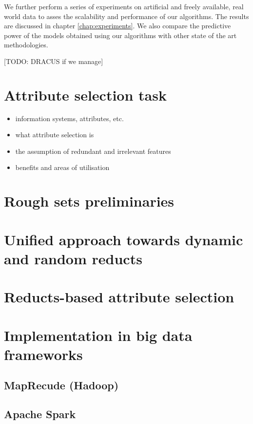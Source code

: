 \documentclass[12pt]{report}
\begin{document}
We further perform a series of experiments on artificial and freely available, real world data to asses the scalability and performance of our algorithms. The results are discussed in chapter \ref{chap:experiments}. We also compare the predictive power of the models obtained using our algorithms with other state of the art methodologies.

[TODO: DRACUS if we manage]

\chapter{Attribute selection task}
\label{chap:attrsel}

\begin{itemize}
  \item information systems, attributes, etc.
  \item what attribute selection is
  \item the assumption of redundant and irrelevant features
  \item benefits and areas of utilisation
\end{itemize}

\chapter{Rough sets preliminaries}
\label{chap:roughsets}


\chapter{Unified approach towards dynamic and random reducts}
\label{chap:dynamicrandomreducts}


\chapter{Reducts-based attribute selection}
\label{chap:reductsattrsel}
  
  
\chapter{Implementation in big data frameworks}
\label{chap:implattlsel}

\section{MapRecude (Hadoop)}

\section{Apache Spark}
\end{document}
